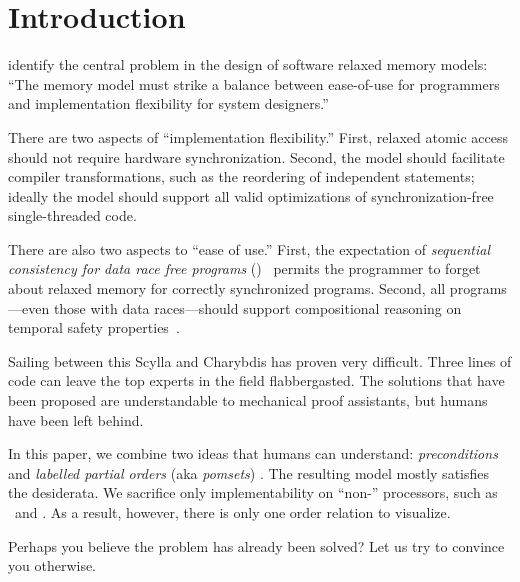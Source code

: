 \section{Introduction}
\label{sec:intro}
\citet{Manson:2005:JMM:1047659.1040336} identify the central problem in the
design of software relaxed memory models: ``The memory model must strike a
balance between ease-of-use for programmers and implementation flexibility
for system designers.''  


There are two aspects of ``implementation flexibility.''  First, relaxed
atomic access should not require hardware synchronization.  Second, the model
should facilitate compiler transformations, such as the reordering of independent
statements; ideally the model should support all valid optimizations of
synchronization\hyp{}free single\hyp{}threaded code.

There are also two aspects to ``ease of use.''  First, the expectation of
\emph{sequential consistency for data race free programs}
(\drfsc)~\cite{DBLP:journals/tpds/AdveH93, DBLP:conf/isca/AdveH90} permits
the programmer to forget about relaxed memory for correctly synchronized
programs.  Second, all programs---even those with data races---should support
compositional reasoning on temporal safety
properties~\cite{PnueliSafety,Misra:1981:PNP:1313338.1313770,StarkSafety,Abadi:1993:CS:151646.151649}.

Sailing between this Scylla and Charybdis has proven very difficult.  Three
lines of code can leave the top experts in the field flabbergasted.  The
solutions that have been proposed are understandable to mechanical proof
assistants, but humans have been left behind.

In this paper, we combine two ideas that humans can understand: \emph{preconditions}
\cite{Hoare:1969:ABC:363235.363259} and \emph{labelled partial orders} (aka \emph{pomsets})
\cite{GISCHER1988199,Plotkin:1997:TSP:266557.266600}.  The resulting model
mostly satisfies the desiderata.  We sacrifice only implementability on
``non-\mca'' processors, such as \ppc\ and \armseven{}. As a result, however,
there is only one order relation to visualize.

Perhaps you believe the problem has already been solved?  Let us try to
convince you otherwise.

